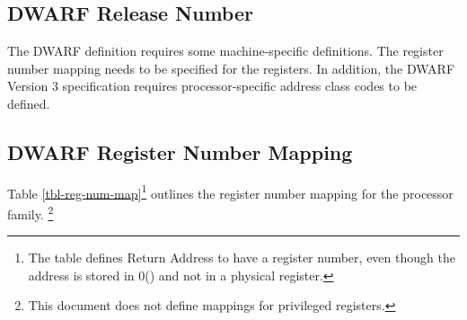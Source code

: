 \subsection{DWARF Release Number}

The DWARF definition requires some machine-specific definitions.
The register number mapping needs to be specified for the \xARCH
registers. In addition, the DWARF Version 3 specification
requires processor-specific address class codes to be defined.

\subsection{DWARF Register Number Mapping}

Table \ref{tbl-reg-num-map}\footnote{The table defines Return Address
  to have a register number, even though the address is stored in
  0(\RSP) and not in a physical register.}  outlines the register
number mapping for the \xARCH processor family.%
\footnote{This document does not define mappings for privileged registers.}%

